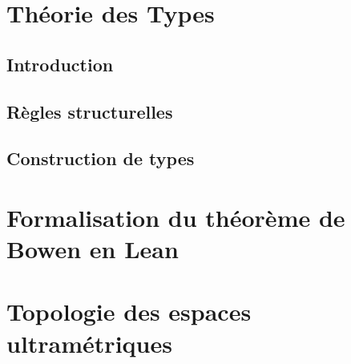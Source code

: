 \documentclass[a4paper, 11pt]{article}
\title{\Title}
\author{\Author}
\date{\today}
\begin{document}
  \maketitle
  \tableofcontents
  \pagebreak

  \section{Théorie des Types}
    \subsection{Introduction}
      


    \subsection{Règles structurelles}
      

    \subsection{Construction de types}
      

  \section{Formalisation du théorème de Bowen en Lean}
    

  \section{Topologie des espaces ultramétriques}
    

\end{document}
